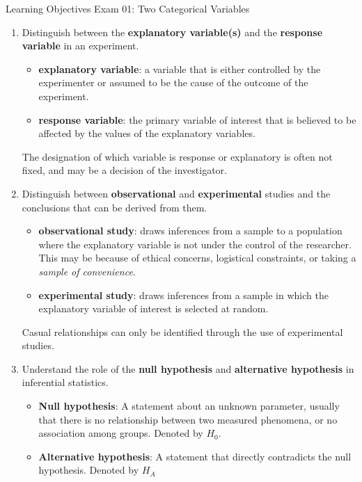 \documentclass[11pt]{article}
\begin{document}
{\LARGE \textcolor{oiB}{Learning Objectives \hfill Exam 01: Two Categorical Variables}} \\

\begin{enumerate}
\renewcommand\labelenumi{\textcolor{light}{\textbf{LO \theenumi.}}}
\item Distinguish between the \textbf{explanatory variable(s)} and the
\textbf{response variable} in an experiment.
\begin{itemize}
\renewcommand{\labelitemi}{{\textcolor{dark}{{\tiny $\blacksquare$}}}}
\item \textbf{explanatory variable}: a variable that is either controlled
by the experimenter or assumed to be the cause of the outcome of the
experiment.
\item \textbf{response variable}: the primary variable of interest that is
believed to be affected by the values of the explanatory variables.
\end{itemize}
The designation of which variable is response or explanatory is often not
fixed, and may be a decision of the investigator.

\item Distinguish between \textbf{observational} and \textbf{experimental}
studies and the conclusions that can be derived from them.
\begin{itemize}
\renewcommand{\labelitemi}{{\textcolor{dark}{{\tiny $\blacksquare$}}}}
\item \textbf{observational study}: draws inferences from a sample to a
population where the explanatory variable is not under the control of the
researcher. This may be because of ethical concerns, logistical constraints,
or taking a \textit{sample of convenience}.
\item \textbf{experimental study}: draws inferences from a sample in which
the explanatory variable of interest is selected at random.
\end{itemize}
Casual relationships can only be identified through the use of experimental
studies.

\item Understand the role of the \textbf{null hypothesis} and
\textbf{alternative hypothesis} in inferential statistics.
\begin{itemize}
\renewcommand{\labelitemi}{{\textcolor{dark}{{\tiny $\blacksquare$}}}}
\item \textbf{Null hypothesis}: A statement about an unknown parameter, usually
that there is no relationship between two measured phenomena, or no association among groups.
Denoted by $H_{0}$.
\item \textbf{Alternative hypothesis}: A statement that directly contradicts the null
hypothesis. Denoted by $H_{A}$
\end{itemize}


\end{enumerate}
\end{document}
